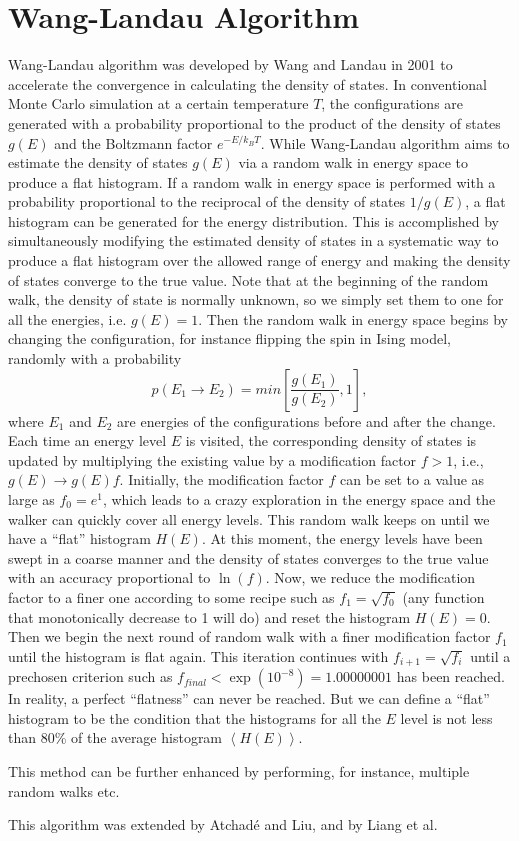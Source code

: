 \section{Wang-Landau Algorithm\label{Sec:ES:Wang-Landau}}
Wang-Landau algorithm was developed by Wang and Landau in 2001 to accelerate the convergence in calculating the density of states.\cite{WangPRL2001} In conventional Monte Carlo simulation at a certain temperature $T$, the configurations are generated with a probability proportional to the product of the density of states $g(E)$ and the Boltzmann factor $e^{-E/k_BT}$. While Wang-Landau algorithm aims to estimate the density of states $g(E)$ via a random walk in energy space to produce a flat histogram. If a random walk in energy space is performed with a probability proportional to the reciprocal of the density of states $1/g(E)$, a flat histogram can be generated for the energy distribution. This is accomplished by simultaneously modifying the estimated density of states in a systematic way to produce a flat histogram over the allowed range of energy and making the density of states converge to the true value. Note that at the beginning of the random walk, the density of state is normally unknown, so we simply set them to one for all the energies, i.e. $g(E)=1$. Then the random walk in energy space begins by changing the configuration, for instance flipping the spin in Ising model, randomly with a probability
\begin{equation}
    p(E_1\to E_2)=min\left[\frac{g(E_1)}{g(E_2)},1\right],
\end{equation}
where $E_1$ and $E_2$ are energies of the configurations before and after the change. Each time an energy level $E$ is visited, the corresponding density of states is updated by multiplying the existing value by a modification factor $f>1$, i.e., $g(E)\to g(E)f$. Initially, the modification factor $f$ can be set to a value as large as $f_0=e^1$, which leads to a crazy exploration in the energy space and the walker can quickly cover all energy levels. This random walk keeps on until we have a ``flat'' histogram $H(E)$. At this moment, the energy levels have been swept in a coarse manner and the density of states converges to the true value with an accuracy proportional to $\ln{(f)}$. Now, we reduce the modification factor to a finer one according to some recipe such as $f_1=\sqrt{f_0}$ (any function that monotonically decrease to 1 will do) and reset the histogram $H(E)=0$. Then we begin the next round of random walk with a finer modification factor $f_1$ until the histogram is flat again. This iteration continues with $f_{i+1}=\sqrt{f_i}$ until a prechosen criterion such as $f_{final}<\exp(10^{-8})=1.00000001$ has been reached. In reality, a perfect ``flatness'' can never be reached. But we can define a ``flat'' histogram to be the condition that the histograms for all the $E$ level is not less than 80\% of the average histogram $\left<H(E)\right>$.

This method can be further enhanced by performing, for instance, multiple random walks etc.

This algorithm was extended by Atchad\'{e} and Liu\cite{AtchadeSS2010}, and by Liang et al\cite{LiangJASA2007}.